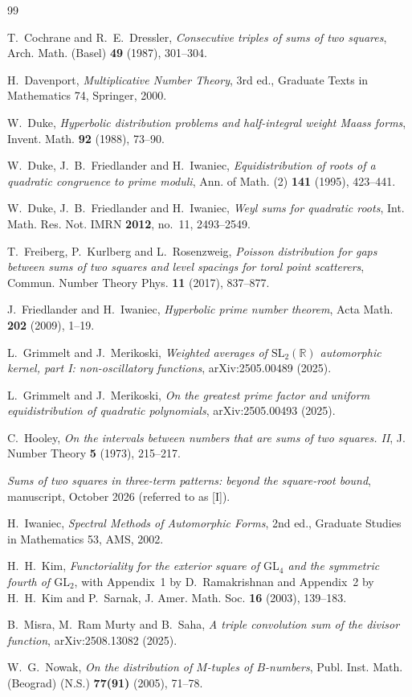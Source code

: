 \documentclass[11pt]{amsart}
\theoremstyle{remark}
\theoremstyle{definition}
\numberwithin{equation}{section}
\begin{document}
\begin{thebibliography}{99}

 T.~Cochrane and R.~E.~Dressler, \emph{Consecutive triples of sums of two squares}, Arch. Math. (Basel) \textbf{49} (1987), 301--304.

 H.~Davenport, \emph{Multiplicative Number Theory}, 3rd ed., Graduate Texts in Mathematics 74, Springer, 2000.

 W.~Duke, \emph{Hyperbolic distribution problems and half-integral weight Maass forms}, Invent. Math. \textbf{92} (1988), 73--90.

 W.~Duke, J.~B.~Friedlander and H.~Iwaniec, \emph{Equidistribution of roots of a quadratic congruence to prime moduli}, Ann. of Math. (2) \textbf{141} (1995), 423--441.

 W.~Duke, J.~B.~Friedlander and H.~Iwaniec, \emph{Weyl sums for quadratic roots}, Int. Math. Res. Not. IMRN \textbf{2012}, no.~11, 2493--2549.

 T.~Freiberg, P.~Kurlberg and L.~Rosenzweig, \emph{Poisson distribution for gaps between sums of two squares and level spacings for toral point scatterers}, Commun. Number Theory Phys. \textbf{11} (2017), 837--877.

 J.~Friedlander and H.~Iwaniec, \emph{Hyperbolic prime number theorem}, Acta Math. \textbf{202} (2009), 1--19.

 L.~Grimmelt and J.~Merikoski, \emph{Weighted averages of $\mathrm{SL}_2(\mathbb R)$ automorphic kernel, part I: non-oscillatory functions}, arXiv:2505.00489 (2025).

 L.~Grimmelt and J.~Merikoski, \emph{On the greatest prime factor and uniform equidistribution of quadratic polynomials}, arXiv:2505.00493 (2025).

 C.~Hooley, \emph{On the intervals between numbers that are sums of two squares. II}, J. Number Theory \textbf{5} (1973), 215--217.

 \emph{Sums of two squares in three-term patterns: beyond the square-root bound}, manuscript, October 2026 (referred to as [I]).

 H.~Iwaniec, \emph{Spectral Methods of Automorphic Forms}, 2nd ed., Graduate Studies in Mathematics 53, AMS, 2002.

 H.~H.~Kim, \emph{Functoriality for the exterior square of $\mathrm{GL}_4$ and the symmetric fourth of $\mathrm{GL}_2$}, with Appendix~1 by D.~Ramakrishnan and Appendix~2 by H.~H.~Kim and P.~Sarnak, J. Amer. Math. Soc. \textbf{16} (2003), 139--183.

 B.~Misra, M.~Ram Murty and B.~Saha, \emph{A triple convolution sum of the divisor function}, arXiv:2508.13082 (2025).

 W.~G.~Nowak, \emph{On the distribution of $M$-tuples of $B$-numbers}, Publ. Inst. Math. (Beograd) (N.S.) \textbf{77(91)} (2005), 71--78.

\end{thebibliography}
\end{document}
